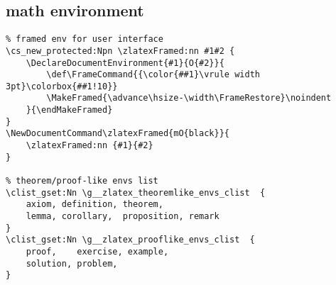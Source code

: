 \subsection{math environment}
\begin{verbatim}
% framed env for user interface
\cs_new_protected:Npn \zlatexFramed:nn #1#2 {
    \DeclareDocumentEnvironment{#1}{O{#2}}{
        \def\FrameCommand{{\color{##1}\vrule width 3pt}\colorbox{##1!10}}
        \MakeFramed{\advance\hsize-\width\FrameRestore}\noindent   
    }{\endMakeFramed}
}
\NewDocumentCommand\zlatexFramed{mO{black}}{
    \zlatexFramed:nn {#1}{#2}
}

% theorem/proof-like envs list 
\clist_gset:Nn \g__zlatex_theoremlike_envs_clist  { 
    axiom, definition, theorem, 
    lemma, corollary,  proposition, remark 
}
\clist_gset:Nn \g__zlatex_prooflike_envs_clist  { 
    proof,    exercise, example, 
    solution, problem,  
}


\end{verbatim}

